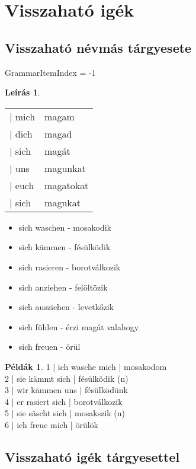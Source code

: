 \documentclass{article}
\theoremstyle{definition}
\newtheorem*{exmp}{Példák}
\newtheorem*{desc}{Leírás}
\begin{document}
\section{Visszaható igék}

\subsection{Visszaható névmás tárgyesete}

GrammarItemIndex = -1

\begin{desc}
\begin{tabular}{ll}
 | mich & magam \\
 | dich & magad \\
 | sich & magát \\
 | uns & magunkat \\
 | euch & magatokat \\
 | sich & magukat \\
\end{tabular}

\begin{itemize}
\item sich waschen - mosakodik
\item sich kämmen - fésülködik
\item sich rasieren - borotválkozik
\item sich anziehen - felöltözik
\item sich ausziehen - levetkőzik
\item sich fühlen - érzi magát valahogy
\item sich freuen - örül
\end{itemize}
\end{desc}

\begin{exmp}
1 | ich wasche mich | mosakodom\\
2 | sie kämmt sich | fésülködik (n)\\
3 | wir kämmen uns | fésülködünk\\
4 | er rasiert sich | borotválkozik\\
5 | sie säscht sich | mosakszik (n)\\
6 | ich freue mich | örülök\\
\end{exmp}

\subsection{Visszaható igék tárgyesettel}
\end{document}
